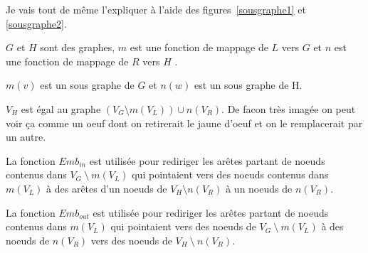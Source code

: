 \documentclass[a4paper, 12pt]{article}
\begin{document}
  Je vais tout de même l'expliquer à l'aide des figures~\ref{sousgraphe1} et \ref{sousgraphe2}.

  \(G\) et \(H\) sont des graphes, \(m\) est une fonction de mappage de \(L\) vers \(G\) et \(n\) est une fonction de mappage de \(R\)  vers \(H\) .

  \(m(v)\) est un sous graphe de \(G\) et \(n(w)\) est un sous graphe de H.

  $V_H$ est égal au graphe \(({V_G} \setminus m({V_L})) \cup n({V_R})\). De facon très imagée on peut voir ça comme un oeuf dont on retirerait le jaune d'oeuf et on le remplacerait par un autre.

  La fonction $Emb_{in}$ est utilisée pour rediriger les arêtes partant de noeuds contenus dans \( {V_G}~\setminus~m({V_L}) \)
  qui pointaient vers des noeuds contenus dans \( m({V_L}) \) à des arêtes d'un noeuds de \( {V_H} \setminus n({V_R}) \) à un noeuds de \( n({V_R}) \).

  La fonction $Emb_{out}$ est utilisée pour rediriger les arêtes partant de noeuds contenus dans \( m({V_L}) \)
  qui pointaient vers des noeuds de \( {V_G}~\setminus~m({V_L}) \) à des noeuds de \(n({V_R}) \) vers des noeuds de \( {V_H}~\setminus~n({V_R}) \).
\end{document}

